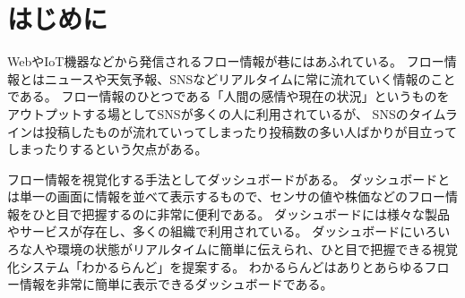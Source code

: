 \section{はじめに}

WebやIoT機器などから発信されるフロー情報が巷にはあふれている。
フロー情報とはニュースや天気予報、SNSなどリアルタイムに常に流れていく情報のことである。
フロー情報のひとつである「人間の感情や現在の状況」というものをアウトプットする場としてSNSが多くの人に利用されているが、
SNSのタイムラインは投稿したものが流れていってしまったり投稿数の多い人ばかりが目立ってしまったりするという欠点がある。

フロー情報を視覚化する手法としてダッシュボードがある。
ダッシュボードとは単一の画面に情報を並べて表示するもので、センサの値や株価などのフロー情報をひと目で把握するのに非常に便利である。
ダッシュボードには様々な製品やサービスが存在し、多くの組織で利用されている。
ダッシュボードにいろいろな人や環境の状態がリアルタイムに簡単に伝えられ、ひと目で把握できる視覚化システム「わかるらんど」を提案する。
わかるらんどはありとあらゆるフロー情報を非常に簡単に表示できるダッシュボードである。